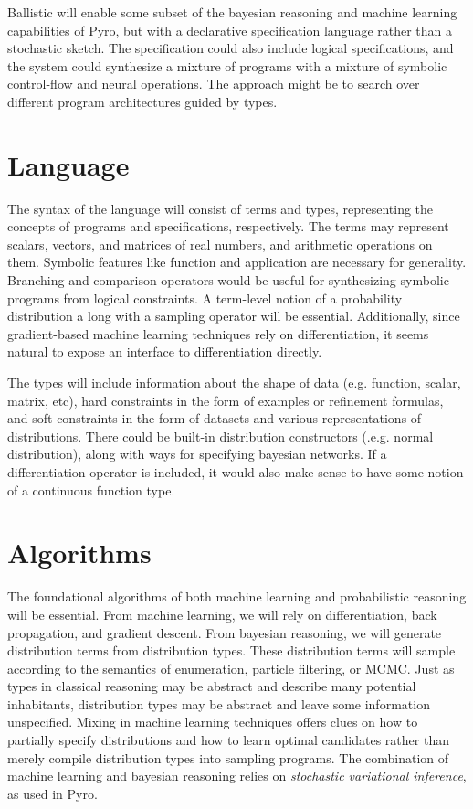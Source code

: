 \documentclass[runningheads]{llncs}
\begin{document}
Ballistic will enable some subset of the bayesian reasoning and machine learning capabilities of Pyro,
but with a declarative specification language rather than a stochastic sketch. 
The specification could also include logical specifications, and the system could synthesize a mixture of 
programs with a mixture of symbolic control-flow and neural operations.
The approach might be to search over different program architectures guided by types.


\section{Language}
The syntax of the language will consist of terms and types, representing the concepts of programs and specifications, respectively. 
The terms may represent scalars, vectors, and matrices of real numbers, and arithmetic operations on them. 
Symbolic features like function and application are necessary for generality.
Branching and comparison operators would be useful for synthesizing symbolic programs from logical constraints. 
A term-level notion of a probability distribution a long with a sampling operator will be essential.
Additionally, since gradient-based machine learning techniques rely on differentiation, 
it seems natural to expose an interface to differentiation directly.

The types will include information about the shape of data (e.g. function, scalar, matrix, etc), 
hard constraints in the form of examples or refinement formulas, 
and soft constraints in the form of datasets and various representations of distributions.
There could be built-in distribution constructors (.e.g. normal distribution), 
along with ways for specifying bayesian networks. 
If a differentiation operator is included, it would also make sense to have some notion of a continuous function type.


\section{Algorithms}
The foundational algorithms of both machine learning and probabilistic reasoning will be essential. 
From machine learning, we will rely on differentiation, back propagation, and gradient descent. 
From bayesian reasoning, we will generate distribution terms from distribution types.   
These distribution terms will sample according to the semantics of enumeration, particle filtering, or MCMC. 
Just as types in classical reasoning may be abstract and describe many potential inhabitants, 
distribution types may be abstract and leave some information unspecified.  
Mixing in machine learning techniques offers clues on how to partially specify distributions
and how to learn optimal candidates rather than merely compile distribution types into sampling programs. 
The combination of machine learning and bayesian reasoning relies on \emph{stochastic variational inference}, as used in Pyro.
\end{document}
